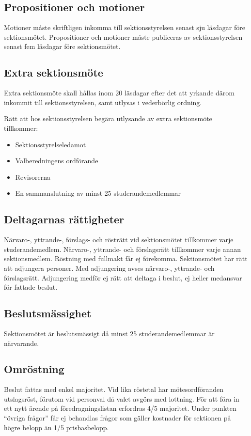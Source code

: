 \documentclass{datateknologsektionen-document}
\begin{document}
\subsection{Propositioner och motioner}
Motioner måste skriftligen inkomma till sektionsstyrelsen senast sju läsdagar före
sektionsmötet. Propositioner och motioner måste publiceras av sektionsstyrelsen
senast fem läsdagar före sektionsmötet.

\subsection{Extra sektionsmöte}
Extra sektionsmöte skall hållas inom 20 läsdagar efter det att yrkande därom inkommit
till sektionsstyrelsen, samt utlysas i vederbörlig ordning.

Rätt att hos sektionsstyrelsen begära utlysande av extra sektionsmöte tillkommer:
\begin{itemize}
  \item Sektionsstyrelseledamot
  \item Valberedningens ordförande
  \item Revisorerna
  \item En sammanslutning av minst 25 studerandemedlemmar
\end{itemize}

\subsection{Deltagarnas rättigheter}
Närvaro-, yttrande-, förslags- och rösträtt vid sektionsmötet tillkommer varje
studerandemedlem. Närvaro-, yttrande- och förslagsrätt tillkommer varje annan
sektionsmedlem. Röstning med fullmakt får ej förekomma. Sektionsmötet har rätt att
adjungera personer. Med adjungering avses närvaro-, yttrande- och förslagsrätt.
Adjungering medför ej rätt att deltaga i beslut, ej heller medansvar för fattade beslut.

\subsection{Beslutsmässighet}
Sektionsmötet är beslutsmässigt då minst 25 studerandemedlemmar är närvarande.

\subsection{Omröstning}
Beslut fattas med enkel majoritet. Vid lika röstetal har mötesordföranden utslagsröst,
förutom vid personval då valet avgörs med lottning. För att föra in ett nytt ärende på
föredragningslistan erfordras 4/5 majoritet. Under punkten ``övriga frågor'' får ej
behandlas frågor som gäller kostnader för sektionen på högre belopp än 1/5 prisbasbelopp.
\end{document}

